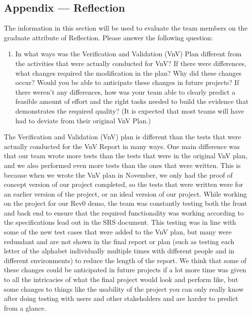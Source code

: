 \documentclass[12pt, titlepage]{article}
\begin{document}
\subsection{Appendix --- Reflection}

The information in this section will be used to evaluate the team members on the
graduate attribute of Reflection.  Please answer the following question:

\begin{enumerate}
  \item In what ways was the Verification and Validation (VnV) Plan different
  from the activities that were actually conducted for VnV?  If there were
  differences, what changes required the modification in the plan?  Why did
  these changes occur?  Would you be able to anticipate these changes in future
  projects?  If there weren't any differences, how was your team able to clearly
  predict a feasible amount of effort and the right tasks needed to build the
  evidence that demonstrates the required quality?  (It is expected that most
  teams will have had to deviate from their original VnV Plan.)
\end{enumerate}

The Verification and Validation (VnV) plan is different than the tests that were actually conducted for the VnV Report in many ways. One main difference was that our team wrote more tests than the tests that were in the original VnV plan, and we also performed even more tests than the ones that were written. This is because when we wrote the VnV plan in November, we only had the proof of concept version of our project completed, so the tests that were written were for an earlier version of the project, or an ideal version of our project. While working on the project for our Rev0 demo, the team was constantly testing both the front and back end to ensure that the required functionality was working according to the specifications lead out in the SRS document. This testing was in line with some of the new test cases that were added to the VnV plan, but many were redundant and are not shown in the final report or plan (such as testing each letter of the alphabet individually multiple times with different people and in different environments) to reduce the length of the report. We think that some of these changes could be anticipated in future projects if a lot more time was given to all the intricacies of what the final project would look and perform like, but some changes to things like the usability of the project you can only really know after doing testing with users and other stakeholders and are harder to predict from a glance. 
\end{document}
